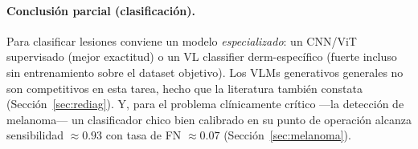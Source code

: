 \documentclass[11pt, a4paper]{article}
\begin{document}
\begin{table}[htbp]
  \centering
  \caption{Detección de melanoma vs.\ estado del arte (tarea binaria melanoma-vs-resto). Este trabajo:
  HAM10000 test ($n=1503$), umbral fijado en validación (esp.\ objetivo $\ge0.85$). Las referencias del
  SOTA se evalúan sobre datasets distintos (DermNet/ISIC) y en binario puro, por lo que la comparación es
  \textbf{orientativa}. Mejor de este trabajo en negrita.}
  \label{tab:sota_melanoma}
\end{table}

\paragraph{Conclusión parcial (clasificación).} Para clasificar lesiones conviene un modelo
\emph{especializado}: un CNN/ViT supervisado (mejor exactitud) o un VL classifier derm-específico
(fuerte incluso sin entrenamiento sobre el dataset objetivo). Los VLMs generativos generales no son
competitivos en esta tarea, hecho que la literatura también constata (Sección~\ref{sec:rediag}). Y, para
el problema clínicamente crítico —la detección de melanoma— un clasificador chico bien calibrado en su
punto de operación alcanza sensibilidad $\approx0.93$ con tasa de FN $\approx0.07$ (Sección~\ref{sec:melanoma}).

\end{document}
